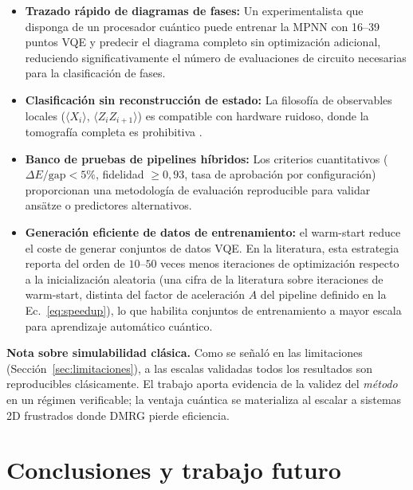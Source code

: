 \documentclass[11pt,a4paper,spanish]{book}
\begin{document}
\begin{itemize}
    \item \textbf{Trazado rápido de diagramas de fases:} Un experimentalista que disponga de un procesador cuántico puede entrenar la MPNN con 16--39 puntos VQE y predecir el diagrama completo sin optimización adicional, reduciendo significativamente el número de evaluaciones de circuito necesarias para la clasificación de fases.

    \item \textbf{Clasificación sin reconstrucción de estado:} La filosofía de observables locales ($\langle X_i \rangle$, $\langle Z_i Z_{i+1} \rangle$) es compatible con hardware ruidoso, donde la tomografía completa es prohibitiva \citep{sharma2026}.

    \item \textbf{Banco de pruebas de pipelines híbridos:} Los criterios cuantitativos ($\Delta E/\text{gap} < 5\%$, fidelidad $\geq 0,93$, tasa de aprobación por configuración) proporcionan una metodología de evaluación reproducible para validar ansätze o predictores alternativos.

    \item \textbf{Generación eficiente de datos de entrenamiento:} el warm-start reduce el coste de generar conjuntos de datos VQE. En la literatura, esta estrategia reporta del orden de $10$--$50$ veces menos iteraciones de optimización respecto a la inicialización aleatoria \citep{puig2025} (una cifra de la literatura sobre iteraciones de warm-start, distinta del factor de aceleración $A$ del pipeline definido en la Ec.~\ref{eq:speedup}), lo que habilita conjuntos de entrenamiento a mayor escala para aprendizaje automático cuántico.
\end{itemize}

\textbf{Nota sobre simulabilidad clásica.} Como se señaló en las limitaciones (Sección~\ref{sec:limitaciones}), a las escalas validadas todos los resultados son reproducibles clásicamente. El trabajo aporta evidencia de la validez del \emph{método} en un régimen verificable; la ventaja cuántica se materializa al escalar a sistemas 2D frustrados donde DMRG pierde eficiencia.



\chapter{Conclusiones y trabajo futuro}
\end{document}
